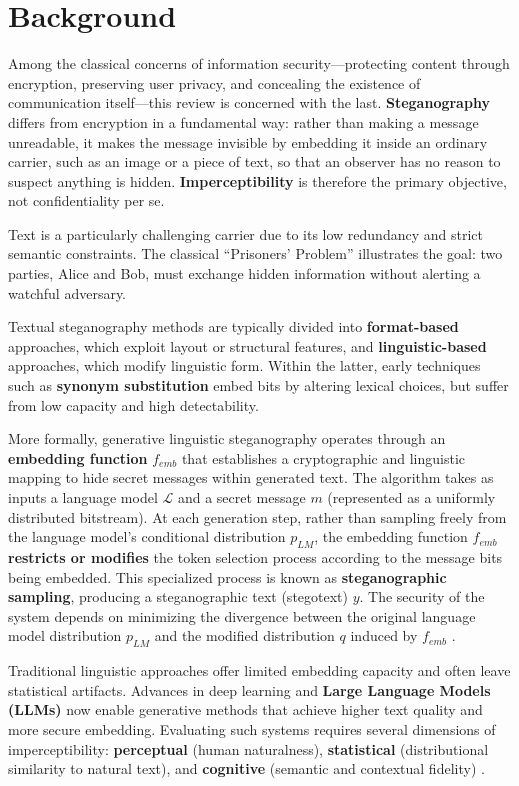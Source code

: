 \section{Background}
\label{sec:background}

Among the classical concerns of information security---protecting content through encryption, preserving user privacy, and concealing the existence of communication itself---this review is concerned with the last. \textbf{Steganography} differs from encryption in a fundamental way: rather than making a message unreadable, it makes the message invisible by embedding it inside an ordinary carrier, such as an image or a piece of text, so that an observer has no reason to suspect anything is hidden. \textbf{Imperceptibility} is therefore the primary objective, not confidentiality per se.

Text is a particularly challenging carrier due to its low redundancy and strict semantic constraints. The classical “Prisoners’ Problem” \cite{simmons1984prisoners} illustrates the goal: two parties, Alice and Bob, must exchange hidden information without alerting a watchful adversary.

Textual steganography methods are typically divided into \textbf{format-based} approaches, which exploit layout or structural features, and \textbf{linguistic-based} approaches, which modify linguistic form. Within the latter, early techniques such as \textbf{synonym substitution} embed bits by altering lexical choices, but suffer from low capacity and high detectability.


More formally, generative linguistic steganography operates through an \textbf{embedding function} $f_{emb}$ that establishes a cryptographic and linguistic mapping to hide secret messages within generated text. The algorithm takes as inputs a language model $\mathcal{L}$ and a secret message $m$ (represented as a uniformly distributed bitstream). At each generation step, rather than sampling freely from the language model's conditional distribution $p_{LM}$, the embedding function $f_{emb}$ \textbf{restricts or modifies} the token selection process according to the message bits being embedded. This specialized process is known as \textbf{steganographic sampling}, producing a steganographic text (stegotext) $y$. The security of the system depends on minimizing the divergence between the original language model distribution $p_{LM}$ and the modified distribution $q$ induced by $f_{emb}$ \cite{zhang2021provably}.

Traditional linguistic approaches offer limited embedding capacity and often leave statistical artifacts. Advances in deep learning and \textbf{Large Language Models (LLMs)} now enable generative methods that achieve higher text quality and more secure embedding. Evaluating such systems requires several dimensions of imperceptibility: \textbf{perceptual} (human naturalness), \textbf{statistical} (distributional similarity to natural text), and \textbf{cognitive} (semantic and contextual fidelity) \cite{ding2023context}.

